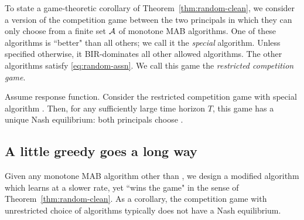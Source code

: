 


To state a game-theoretic corollary of Theorem~\ref{thm:random-clean}, we consider a version of the competition game between the two principals in which they can only choose from a finite set $\mathcal{A}$ of monotone MAB algorithms. One of these algorithms is ``better" than all others; we call it the \emph{special} algorithm. Unless specified otherwise, it BIR-dominates all other allowed algorithms. The other algorithms satisfy \eqref{eq:random-assn}. We call this game the \emph{restricted competition game}.

\begin{corollary}\label{cor:random}
Assume \HardMaxRandom response function. Consider the restricted competition game with special algorithm \alg. Then, for any sufficiently large time horizon $T$, this game has a unique Nash equilibrium: both principals choose \alg.
\end{corollary}


\subsection{A little greedy goes a long way}
\label{sec:random-greedy}

Given any monotone MAB algorithm other than \DynGreedy, we design a modified algorithm which learns at a slower rate, yet ``wins the game" in the sense of Theorem~\ref{thm:random-clean}. As a corollary, the competition game with unrestricted choice of algorithms typically does not have a Nash equilibrium.

